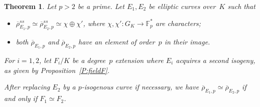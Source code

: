 \documentclass[12pt, reqno]{amsart}
\newcommand{\F}{\mathbb{F}}
\newcommand{\rhobar}{{\overline{\rho}}}
\numberwithin{equation}{section}
\newtheorem{theorem}{Theorem}[section]
\theoremstyle{definition}
\theoremstyle{remark}
\begin{document}
\begin{theorem} \label{T:reducible}
Let $p > 2$ be a prime. Let $E_1, E_2$ be elliptic curves 
over~$K$ such that 
\begin{itemize}
 \item[(i)] $\rhobar_{E_1,p}^{ss} \simeq \rhobar_{E_2,p}^{ss} \simeq \chi \oplus \chi'$,  where $\chi, \chi' : G_K \to \F_p^*$ are characters;
 \item[(ii)] both $\rhobar_{E_1,p}$ and $\rhobar_{E_2,p}$ have an element of
 order~$p$ in their image.
\end{itemize}
For $i=1,2$, let $F_i/K$ be a degree~$p$ extension where $E_i$
acquires a second isogeny, as given by Proposition~\ref{P:fieldF}.

After replacing $E_2$ by a $p$-isogenous curve if necessary, we have
$\rhobar_{E_1,p} \simeq \rhobar_{E_2,p}$ if and only if $F_1 \simeq
F_2$.
\end{theorem}
\end{document}
